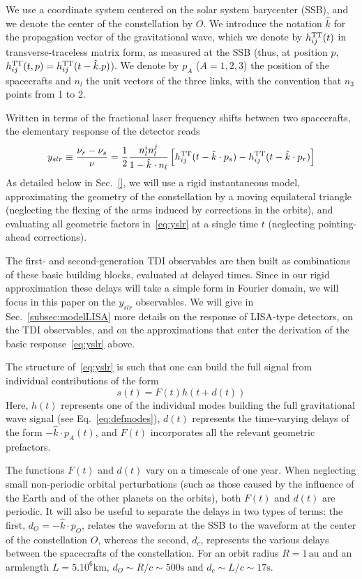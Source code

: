\documentclass[aps,showpacs,%
prd,superscriptaddress,nofootinbib]{revtex4}
\newcommand{\be}{\begin{equation}}
\newcommand{\ee}{\end{equation}}
\begin{document}
We use a coordinate system centered on the solar system barycenter (SSB), and we denote the center of the constellation by $O$. We introduce the notation $\hat{k}$ for the propagation vector of the gravitational wave, which we denote by $h_{ij}^{\rm TT}(t)$ in transverse-traceless matrix form, as measured at the SSB (thus, at position $p$, $h_{ij}^{\rm TT}(t, p) = h_{ij}^{\rm TT}(t - \hat{k}.p)$). We denote by $p_{A}$ ($A=1,2,3$) the position of the spacecrafts and $n_{l}$ the unit vectors of the three links, with the convention that $n_{3}$ points from 1 to 2.

Written in terms of the fractional laser frequency shifts between two spacecrafts, the elementary response of the detector reads~\cite{EW75, RCP04, Vallisneri04}
\be\label{eq:yslr}
	y_{slr} \equiv \frac{\nu_{r} - \nu_{s}}{\nu} = \frac{1}{2} \frac{n_{l}^{i}n_{l}^{j}}{1 - \hat{k}\cdot n_{l}} \left[ h_{ij}^{\rm TT}(t - \hat{k}\cdot p_{s}) - h_{ij}^{\rm TT}(t - \hat{k}\cdot p_{r}) \right]
\ee
As detailed below in Sec.~\ref{}, we will use a rigid instantaneous model, approximating the geometry of the constellation by a moving equilateral triangle (neglecting the flexing of the arms induced by corrections in the orbits), and evaluating all geometric factors in~\eqref{eq:yslr} at a single time $t$ (neglecting pointing-ahead corrections).

The first- and second-generation TDI observables are then built as combinations of these basic building blocks, evaluated at delayed times. Since in our rigid approximation these delays will take a simple form in Fourier domain, we will focus in this paper on the $y_{slr}$ observables. We will give in Sec.~\ref{subsec:modelLISA} more details on the response of LISA-type detectors, on the TDI observables, and on the approximations that enter the derivation of the basic response~\eqref{eq:yslr} above.

The structure of~\eqref{eq:yslr} is such that one can build the full signal from individual contributions of the form
\be
	s(t) = F(t) h(t + d(t))
\ee
Here, $h(t)$ represents one of the individual modes building the full gravitational wave signal (see Eq.~\eqref{eq:defmodes}), $d(t)$ represents the time-varying delays of the form $-\hat{k}\cdot p_{A}(t)$, and $F(t)$ incorporates all the relevant geometric prefactors.

The functions $F(t)$ and $d(t)$ vary on a timescale of one year. When neglecting small non-periodic orbital perturbations (such as those caused by the influence of the Earth and of the other planets on the orbits), both $F(t)$ and $d(t)$ are periodic. It will also be useful to separate the delays in two types of terms: the first, $d_{O} = -\hat{k}\cdot p_{O}$, relates the waveform at the SSB to the waveform at the center of the constellation $O$, whereas the second, $d_{c}$, represents the various delays between the spacecrafts of the constellation. For an orbit radius $R=1\,\mathrm{au}$ and an armlength $L=5.10^{6}\mathrm{km}$, $d_{O} \sim R/c \sim 500\mathrm{s}$ and $d_{c} \sim L/c \sim 17\mathrm{s}$.
\end{document}
